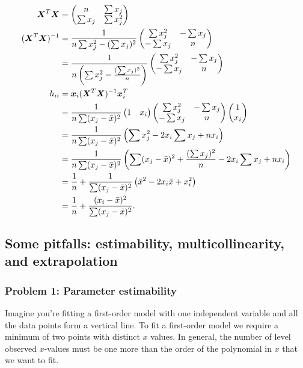 \documentclass{report}
\begin{document}
	\begin{align*}
		\boldsymbol{X}^T\boldsymbol{X}&=\begin{pmatrix}
			n & \sum x_j \\ \sum x_j & \sum x^2_j
		\end{pmatrix}\\
		(\boldsymbol{X}^T\boldsymbol{X})^{-1}&=\frac{1}{n\sum x^2_j - (\sum x_j)^2}\begin{pmatrix}
			\sum x^2_j & -\sum x_j \\ -\sum x_j & n
		\end{pmatrix}\\
		&=\frac{1}{n\left(\sum x_j^2 -\frac{(\sum x_j)^2}{n}\right)}\begin{pmatrix}
			\sum x^2_j & -\sum x_j \\ -\sum x_j & n
		\end{pmatrix}\\
		h_{ii}&=\boldsymbol{x}_i(\boldsymbol{X}^T\boldsymbol{X})^{-1}\boldsymbol{x}_i^T\\
		&=\frac{1}{n\sum (x_j-\bar{x})^2}
		\begin{pmatrix}
			1 & x_i
		\end{pmatrix}\begin{pmatrix}
			\sum x^2_j & -\sum x_j \\ -\sum x_j & n
		\end{pmatrix}\begin{pmatrix}
		1 \\ x_i
		\end{pmatrix}\\
		&=\frac{1}{n\sum (x_j-\bar{x})^2}\left(\sum x_j^2-2x_i\sum x_j+nx_i\right)\\
		&=\frac{1}{n\sum (x_j-\bar{x})^2}\left(\sum (x_j-\bar{x})^2+\frac{(\sum x_j)^2}{n}-2x_i\sum x_j+nx_i\right)\\
		&=\frac{1}{n}+\frac{1}{\sum(x_j-\bar{x})^2}\left(\bar{x}^2-2x_i\bar{x}+x_i^2\right)\\
		&=\frac{1}{n}+\frac{(x_i-\bar{x})^2}{\sum(x_j-\bar{x})^2}.\\
	\end{align*}
	
	\subsection{Some pitfalls: estimability, multicollinearity, and extrapolation}
	\subsubsection{Problem 1: Parameter estimability}
	Imagine you're fitting a first-order model with one independent variable and all the data points form a vertical line. To fit a first-order model we require a minimum of two points with distinct $x$ values. In general, the number of level observed $x$-values must be one more than the order of the polynomial in $x$ that we want to fit.\\
	 
\end{document}
